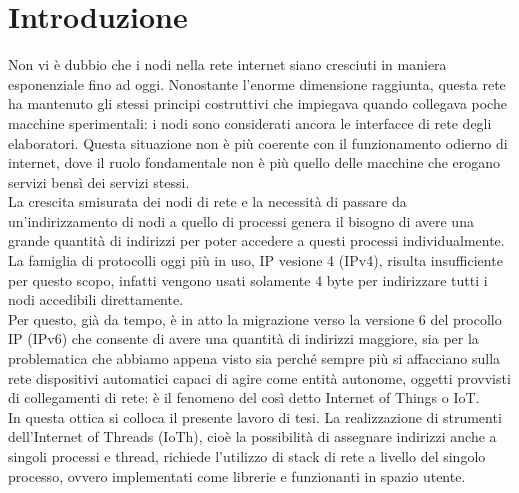 

\chapter*{Introduzione}                 %


Non vi \`e dubbio che i nodi nella rete internet siano cresciuti in maniera esponenziale fino ad oggi. Nonostante l'enorme dimensione raggiunta, questa rete ha mantenuto gli stessi principi costruttivi che impiegava quando collegava poche macchine sperimentali: i nodi sono considerati ancora le interfacce di rete degli elaboratori. Questa situazione non \`e pi\`u coerente con il funzionamento odierno di internet, dove il ruolo fondamentale non \`e pi\`u quello delle macchine che erogano servizi bens\`i dei servizi stessi.\\
La crescita smisurata dei nodi di rete e la necessit\`a di passare da un'indirizzamento di nodi a quello di processi genera il bisogno di avere una grande quantit\`a di indirizzi per poter accedere a questi processi individualmente. La famiglia di protocolli oggi pi\`u in uso, IP vesione 4 (IPv4), risulta insufficiente per questo scopo, infatti vengono usati solamente 4 byte per indirizzare tutti i nodi accedibili direttamente.\\
Per questo, gi\`a da tempo, \`e in atto la migrazione verso la versione 6 del procollo IP (IPv6) che consente di avere una quantit\`a di indirizzi maggiore, sia per la problematica che abbiamo appena visto sia perch\'e sempre pi\`u si affacciano sulla rete dispositivi automatici capaci di agire come entit\`a autonome, oggetti provvisti di collegamenti di rete: \`e il fenomeno del cos\`i detto Internet of Things o IoT.\\
In questa ottica si colloca il presente lavoro di tesi. La realizzazione di strumenti dell'Internet of Threads (IoTh), cio\`e la possibilit\`a di assegnare indirizzi anche a singoli processi e thread, richiede l'utilizzo di stack di rete a livello del singolo processo, ovvero implementati come librerie e funzionanti in spazio utente.\\
